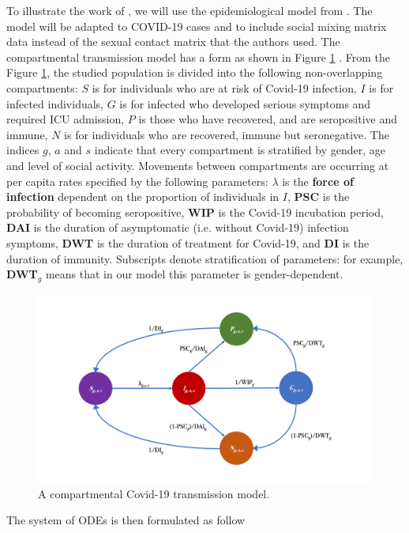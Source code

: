 \documentclass[12pt]{article}
\begin{document}
To illustrate the work of \cite{Diekmann:2010}, we will use the epidemiological model from \cite{Gareth:2013}. The model will be adapted to COVID-19 cases and to include social mixing matrix data instead of the sexual contact matrix that the authors used. The compartmental transmission model has a form as shown in Figure \ref{fig:model} \cite[p.5]{Gareth:2013}. From the Figure \ref{fig:model}, the studied population is divided into the following non-overlapping compartments: $S$ is for individuals who are at risk of Covid-19 infection, $I$ is for infected individuals, $G$ is for infected who developed serious symptoms and required ICU admission, $P$ is those who have recovered, and are seropositive and immune, $N$ is for individuals who are recovered, immune but seronegative. The indices $g$, $a$ and $s$ indicate that every compartment is stratified by gender, age and level of social activity. Movements between compartments are occurring at per capita rates specified by the following parameters: $\lambda$ is the \textbf{force of infection} dependent on the proportion of individuals in $I$, \textbf{PSC} is the probability of becoming seropositive, \textbf{WIP} is the Covid-19 incubation period, \textbf{DAI} is the duration of asymptomatic (i.e. without Covid-19) infection symptoms, \textbf{DWT} is the duration of treatment for Covid-19, and \textbf{DI} is the duration of immunity. Subscripts denote stratification of parameters: for example, \textbf{DWT}$_{g}$ means that in our model this parameter is gender-dependent.

\begin{figure}[h!]
\centering
\includegraphics[width=1\textwidth]{COVIDb}
\caption{A compartmental Covid-19 transmission model.}
\label{fig:model}
\end{figure}

The system of ODEs is then formulated as follow
\end{document}

